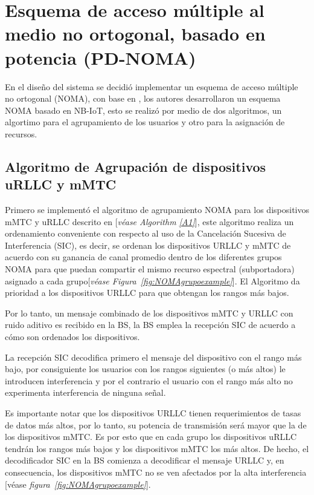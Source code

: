 \break

\section{Esquema de acceso múltiple al medio no ortogonal, basado en potencia (PD-NOMA)}

En el diseño del sistema se decidió implementar un esquema de acceso múltiple no ortogonal (NOMA), con base en \parencite{Shahini2019}, los autores desarrollaron un esquema NOMA basado en NB-IoT, esto se realizó por medio de dos algoritmos, un algortimo para el agrupamiento de los usuarios y otro para la asignación de recursos.

\subsection{Algoritmo de Agrupación de dispositivos uRLLC  y mMTC}

Primero se implementó el algoritmo de agrupamiento NOMA para los dispositivos mMTC y uRLLC descrito en \parencite{Shahini2019}[\textit{véase Algorithm \ref{A1}}], este algoritmo realiza un ordenamiento conveniente con respecto al uso de la Cancelación Sucesiva de Interferencia (SIC), es decir, se ordenan los dispositivos URLLC y mMTC de acuerdo con su ganancia de canal promedio dentro de los diferentes grupos NOMA para que puedan compartir el mismo recurso espectral (subportadora) asignado a cada grupo[\textit{véase Figura~\ref{fig:NOMAgrupoexample}}]. El Algoritmo da prioridad a los dispositivos URLLC para que obtengan los rangos más bajos. \newline

Por lo tanto, un mensaje combinado de los dispositivos mMTC y URLLC con ruido aditivo es recibido en la BS, la BS emplea la recepción SIC de acuerdo a cómo son ordenados los dispositivos. \newline

La recepción SIC decodifica primero el mensaje del dispositivo con el rango más bajo, por consiguiente los usuarios con los rangos siguientes (o más altos) le introducen interferencia y por el contrario el usuario con el rango más alto no experimenta interferencia de ninguna señal.\newline

Es importante notar que los dispositivos URLLC tienen requerimientos de tasas de datos más altos, por lo tanto, su potencia de transmisión será mayor que la de los dispositivos mMTC. Es por esto que en cada grupo los dispositivos uRLLC tendrán los rangos más bajos y los dispositivos mMTC los más altos. De hecho, el decodificador SIC en la BS comienza a decodificar el mensaje URLLC y, en consecuencia, los dispositivos mMTC no se ven afectados por la alta interferencia [véase \textit{figura~\ref{fig:NOMAgrupoexample}}].\newline


